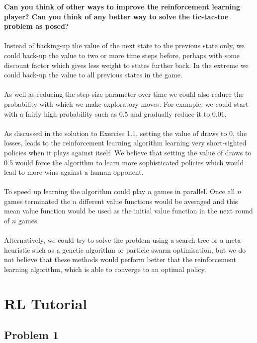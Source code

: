 \documentclass[a4paper,11pt]{article}
\numberwithin{equation}{section}
\theoremstyle{remark}
\begin{document}
\textbf{Can you think of other ways to improve the reinforcement learning player? Can you think of any better way to solve the tic-tac-toe problem as posed?}
\\ \\
Instead of backing-up the value of the next state to the previous state only, we could back-up the value to two or more time steps before, perhaps with some discount factor which gives less weight to states further back. In the extreme we could back-up the value to all previous states in the game. 
\\ \\
As well as reducing the step-size parameter over time we could also reduce the probability with which we make exploratory moves. For example, we could start with a fairly high probability such as 0.5 and gradually reduce it to 0.01.
\\ \\
As discussed in the solution to Exercise 1.1, setting the value of draws to 0, the losses, leads to the reinforcement learning algorithm learning very short-sighted policies when it plays against itself. We believe that setting the value of draws to 0.5 would force the algorithm to learn more sophisticated policies which would lead to more wins against a human opponent.
\\ \\
To speed up learning the algorithm could play $n$ games in parallel. Once all $n$ games terminated the $n$ different value functions would be averaged and this mean value function would be used as the initial value function in the next round of $n$ games.
\\ \\
Alternatively, we could try to solve the problem using a search tree or a meta-heuristic such as a genetic algorithm or particle swarm optimisation, but we do not believe that these methods would perform better that the reinforcement learning algorithm, which is able to converge to an optimal policy.

\section{RL Tutorial}

\subsection{Problem 1}
\end{document}
